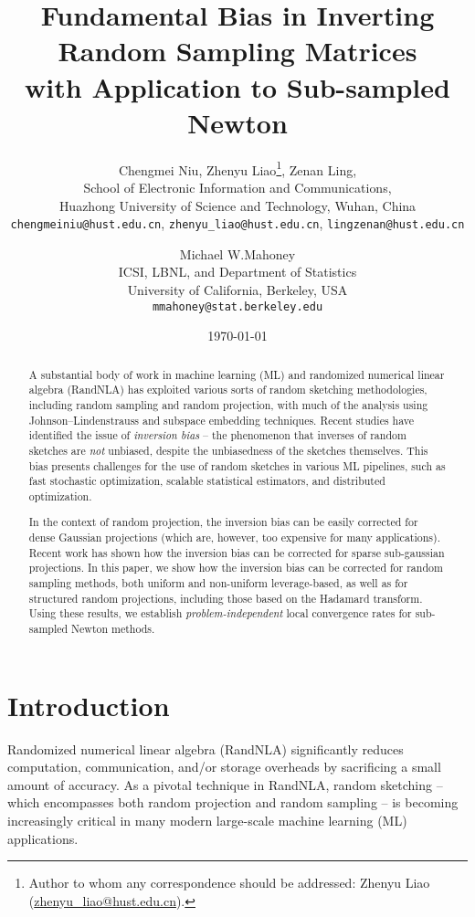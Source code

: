 \documentclass[11pt,a4paper]{article}
\title{Fundamental Bias in Inverting Random Sampling Matrices\\ with Application to Sub-sampled Newton}
\author{
  Chengmei Niu, \quad  Zhenyu Liao\footnote{Author to whom any correspondence should be addressed: Zhenyu Liao (\href{mailto:zhenyu_liao@hust.edu.cn}{zhenyu\_liao@hust.edu.cn}).}, \quad  Zenan Ling,\\ 
  School of Electronic Information and Communications,\\
  Huazhong University of Science and Technology, Wuhan, China\\
  \texttt{chengmeiniu@hust.edu.cn}, \texttt{zhenyu\_liao@hust.edu.cn}, \texttt{lingzenan@hust.edu.cn}
  \and
  Michael W.\@ Mahoney\\
  ICSI, LBNL, and Department of Statistics\\
  University of California, Berkeley, USA\\
  \texttt{mmahoney@stat.berkeley.edu}
}
\date{\today}
\begin{document}
\maketitle


\begin{abstract}
A substantial body of work in machine learning (ML) and randomized numerical linear algebra (RandNLA) has exploited various sorts of random sketching methodologies, including random sampling and random projection, with much of the analysis using Johnson--Lindenstrauss and subspace embedding techniques.  
Recent studies have identified the issue of \emph{inversion bias} -- the phenomenon that inverses of random sketches are \emph{not} unbiased, despite the unbiasedness of the sketches themselves. 
This bias presents challenges for the use of random sketches in various ML pipelines, such as fast stochastic optimization, scalable statistical estimators, and distributed optimization.

In the context of random projection, the inversion bias can be easily corrected for dense Gaussian projections (which are, however, too expensive for many applications). 
Recent work has shown how the inversion bias can be corrected for sparse sub-gaussian projections.
In this paper, we show how the inversion bias can be corrected for random sampling methods, both uniform and non-uniform leverage-based, as well as for structured random projections, including those based on the Hadamard transform.  
Using these results, we establish \emph{problem-independent} local convergence rates for sub-sampled Newton methods.
\end{abstract}


\section{Introduction} 
\label{sec:intro}

Randomized numerical linear algebra (RandNLA) significantly reduces computation, communication, and/or storage overheads by sacrificing a small amount of accuracy. 
As a pivotal technique in RandNLA, random sketching -- which encompasses both random projection and random sampling -- is becoming increasingly critical in many modern large-scale machine learning (ML) applications.
\end{document}
